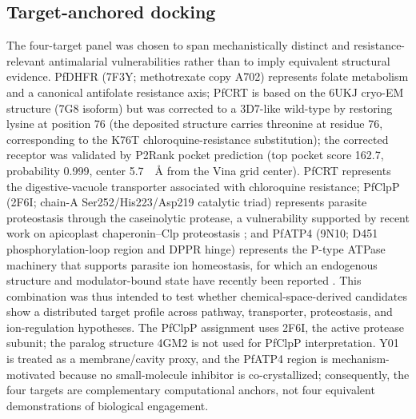 \documentclass[journal=jcisd8,manuscript=article]{achemso}
\begin{document}
\subsection{Target-anchored docking}\label{sec:methods_docking}
The four-target panel was chosen to span mechanistically distinct and resistance-relevant antimalarial vulnerabilities rather than to imply equivalent structural evidence. PfDHFR (7F3Y; methotrexate copy A702) represents folate metabolism and a canonical antifolate resistance axis; PfCRT is based on the 6UKJ cryo-EM structure (7G8 isoform) but was corrected to a 3D7-like wild-type by restoring lysine at position 76 (the deposited structure carries threonine at residue 76, corresponding to the K76T chloroquine-resistance substitution); the corrected receptor was validated by P2Rank pocket prediction (top pocket score 162.7, probability 0.999, center 5.7~\SI{}{\angstrom} from the Vina grid center). PfCRT represents the digestive-vacuole transporter associated with chloroquine resistance; PfClpP (2F6I; chain-A Ser252/His223/Asp219 catalytic triad) represents parasite proteostasis through the caseinolytic protease, a vulnerability supported by recent work on apicoplast chaperonin--Clp proteostasis \cite{Tissawak2025}; and PfATP4 (9N10; D451 phosphorylation-loop region and DPPR hinge) represents the P-type ATPase machinery that supports parasite ion homeostasis, for which an endogenous structure and modulator-bound state have recently been reported \cite{Haile2025}. This combination was thus intended to test whether chemical-space-derived candidates show a distributed target profile across pathway, transporter, proteostasis, and ion-regulation hypotheses. The PfClpP assignment uses 2F6I, the active protease subunit; the paralog structure 4GM2 is not used for PfClpP interpretation. Y01 is treated as a membrane/cavity proxy, and the PfATP4 region is mechanism-motivated because no small-molecule inhibitor is co-crystallized; consequently, the four targets are complementary computational anchors, not four equivalent demonstrations of biological engagement.
\end{document}
